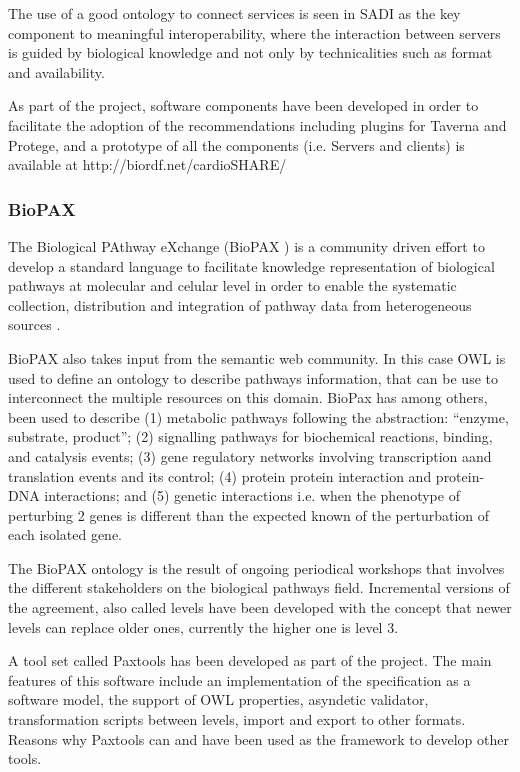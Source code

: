 The use of a good ontology to connect services is seen in SADI as the key component to meaningful interoperability, where the interaction between servers is guided by biological knowledge and not only by technicalities such as format and availability.

As part of the project, software components have been developed in order to facilitate the adoption of the recommendations including plugins for Taverna and Protege, and a  prototype of all the components (i.e. Servers and clients) is available at http://biordf.net/cardioSHARE/

\subsubsection{BioPAX}
The Biological PAthway eXchange (BioPAX ) is a community driven effort to develop a standard language to facilitate knowledge representation of biological pathways at molecular and celular level in order to enable the systematic collection, distribution and integration of pathway data from heterogeneous sources \cite{DEM2010}.

BioPAX also takes input from the semantic web community. In this case OWL is used to define an ontology to describe pathways information, that can be use to interconnect the multiple resources on this domain. BioPax has among others, been used to describe (1) metabolic pathways following the abstraction: ``enzyme, substrate, product''; (2) signalling pathways for biochemical reactions, binding, and catalysis events; (3) gene regulatory networks involving transcription aand translation events and its control; (4) protein protein interaction and protein-DNA interactions; and (5) genetic interactions i.e. when the phenotype of perturbing 2 genes is different than the expected known of the perturbation of each isolated gene.

The BioPAX ontology is the result of ongoing periodical workshops that involves the different stakeholders on the biological pathways field. Incremental versions of the agreement, also called levels have been developed with the concept that newer levels can replace older ones, currently the higher one is level 3.

A tool set called Paxtools has been developed as part of the project. The main features of this software include an implementation of the specification as a software model, the support of OWL properties, asyndetic validator, transformation scripts between levels, import and export to other formats. Reasons why Paxtools can and have been used as the framework to develop other tools.


